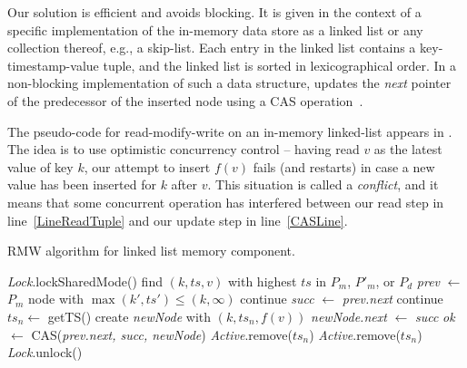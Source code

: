
Our solution is efficient and avoids blocking. It is given in
the context of a specific implementation of the in-memory data store as a linked
list or any collection thereof, e.g., a skip-list. Each entry in the linked list
contains  a key-timestamp-value tuple, and the linked list is sorted in
lexicographical order. In a non-blocking implementation of such a data
structure,  updates the \emph{next} pointer of the
predecessor of the inserted node using a CAS operation~\cite{Herlihy2008}.

The pseudo-code for read-modify-write on an in-memory linked-list appears in
.
The  idea is to use optimistic concurrency control -- having read $v$ as the latest
value of key $k$, our attempt to insert $f(v)$ fails (and restarts) in case a new value has been inserted for $k$ after $v$.
This situation is called a \emph{conflict},
and it means that some concurrent operation has interfered between our read step in line~\ref{LineReadTuple} and our update step in  line~\ref{CASLine}.

\begin{algorithm} [t]
\small
\caption{\small RMW algorithm for linked list memory component.}
\label{alg:RMW}
%
\begin{algorithmic}[1]
\makeatletter\setcounter{ALG@line}{0}\makeatother
%
    \State \emph{Lock}.lockSharedMode()
		\Repeat
	    \State find $(k,ts,v)$ with highest $ts$ in  $P_{m}$, $P'_{m}$, or $P_{d}$ \label{LineReadTuple}
  	  \State \emph{prev} $\gets$ $P_{m}$ node with $\max (k',ts') \leq (k,\infty)$ \label{LineSetPrev}
       continue  \label{conflict1Line}   \EndIf {}
  	  \State \emph{succ} $\gets$ \emph{prev.next} \label{LineSetNext}
  	   continue  \label{conflict2Line}   \EndIf
	  	\State $ts_n \gets$ getTS() \label{newTS}
    	\State create \emph{newNode} with $(k,ts_n,f(v))$
    	\State \emph{newNode.next} $\gets$ \emph{succ}
	    \State \emph{ok} $\gets$ CAS(\emph{prev.next, succ, newNode}) \label{CASLine}
       \emph{Active}.remove($ts_n$) 
      \EndIf
    \State \emph{Active}.remove($ts_n$)
    \State \emph{Lock}.unlock()
\EndProcedure
%
\end{algorithmic}
\label{Al:RMWAlg}
\end{algorithm}

